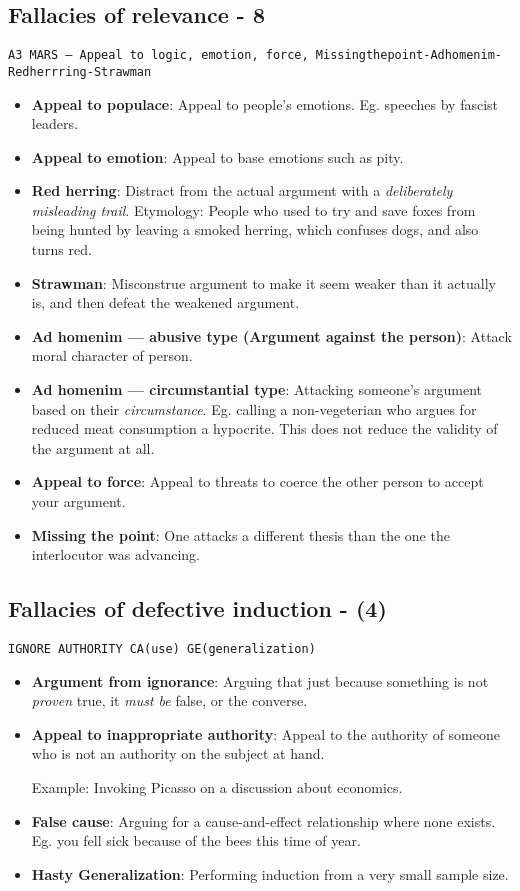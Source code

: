 \documentclass[5pt]{book}
\begin{document}
\subsection{Fallacies of relevance - 8} 
\texttt{A3 MARS --- Appeal to {logic, emotion, force}, Missingthepoint-Adhomenim-Redherrring-Strawman}
\begin{itemize}
    \item \textbf{Appeal to populace}: Appeal to people's emotions. Eg. speeches
        by fascist leaders.
    \item \textbf{Appeal to emotion}: Appeal to base emotions such as pity.
    \item \textbf{Red herring}: Distract from the actual argument with a
        \textit{deliberately misleading trail}. Etymology: People who used to
        try and save foxes from being hunted by leaving a smoked herring, which
        confuses dogs, and also turns red.
    \item \textbf{Strawman}: Misconstrue argument to make it seem weaker
        than it actually is, and then defeat the weakened argument.
    \item \textbf{Ad homenim --- abusive type (Argument against the person)}: Attack moral character
        of person. 
    \item \textbf{Ad homenim --- circumstantial type}: Attacking someone's argument
        based on their \textit{circumstance}. Eg. calling a non-vegeterian who
        argues for reduced meat consumption a hypocrite. This does not reduce the
        validity of the argument at all.
    \item \textbf{Appeal to force}: Appeal to threats to coerce the other
        person to accept your argument.
    \item \textbf{Missing the point}: One attacks a different thesis than
        the one the interlocutor was advancing.

\end{itemize}
\subsection{Fallacies of defective induction - (4)}
\texttt{IGNORE AUTHORITY CA(use) GE(generalization)}
\begin{itemize}
    \item \textbf{Argument from ignorance}: Arguing that just because something
        is not \emph{proven} true, it \textit{must be} false, or the converse.
    \item \textbf{Appeal to inappropriate authority}: Appeal to the authority
        of someone who is not an authority on the subject at hand. 

        Example: Invoking Picasso on a discussion about economics.

    \item \textbf{False cause}: Arguing for a cause-and-effect relationship
        where none exists. Eg. you fell sick because of the bees this time
        of year.

    \item \textbf{Hasty Generalization}: Performing induction from a very
        small sample size.
\end{itemize}
\end{document}

